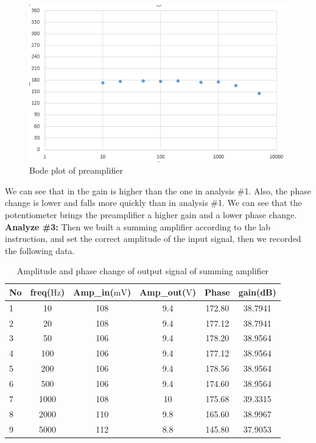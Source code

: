 \begin{figure}[!htbp]
	\centering 
	\begin{framed}
		\includegraphics[width=\linewidth]{images/1_4.PNG} 
		\caption{Bode plot of preamplifier}
		\label{fig:105} 
	\end{framed}
\end{figure}

\phantom{ } We can see that in the gain is higher than the one in analysis \#1. Also, the phase change is lower and falls more quickly than in analysis \#1. We can see that the potentiometer brings the preamplifier a higher gain and a lower phase change.\\

\textbf{Analyze \#3:} \newline
\phantom{ } Then we built a summing amplifier according to the lab instruction, and set the correct amplitude of the input signal, then we recorded the following data.

\begin{table}[!htbp]
	\centering
	\caption{Amplitude and phase change of output signal of summing amplifier}
	\begin{tabular}{lccccc}
		\toprule
		No &freq($\si{\hertz}$) &Amp\_in($\si{\milli\volt}$)&Amp\_out($\si{\volt}$)&Phase&gain(dB)\\
		\midrule
		1	&10		&108	&9.4	&172.80	&38.7941\\
		2	&20		&108	&9.4	&177.12	&38.7941\\
		3	&50		&106	&9.4	&178.20	&38.9564\\
		4	&100	&106	&9.4	&177.12	&38.9564\\
		5	&200	&106	&9.4	&178.56	&38.9564\\
		6	&500	&106	&9.4	&174.60	&38.9564\\
		7	&1000	&108	&10		&175.68	&39.3315\\
		8	&2000	&110	&9.8	&165.60	&38.9967\\
		9	&5000	&112	&8.8	&145.80	&37.9053\\
		\bottomrule
	\end{tabular}
	\label{tab:sumamp}
\end{table}

